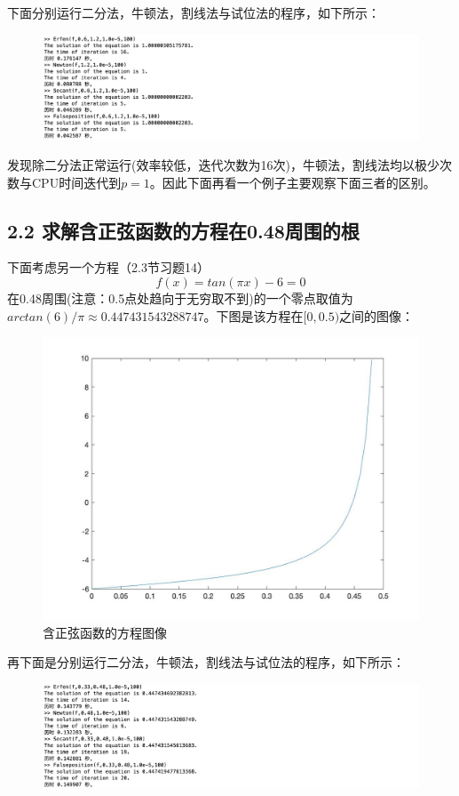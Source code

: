\documentclass{article}
\begin{document}
    下面分别运行二分法，牛顿法，割线法与试位法的程序，如下所示：
    \begin{figure}[h]
    \centering
    \includegraphics[scale=0.5]{运行程序2.jpg}
    \end{figure}

    发现除二分法正常运行(效率较低，迭代次数为16次)，牛顿法，割线法均以极少次数与CPU时间迭代到$p=1$。因此下面再看一个例子主要观察下面三者的区别。

\subsection{2.2 求解含正弦函数的方程在0.48周围的根}

    下面考虑另一个方程（2.3节习题14）
    $$f(x)=tan(\pi x)-6=0
    $$
    在0.48周围(注意：0.5点处趋向于无穷取不到)的一个零点取值为$arctan(6)/\pi\approx0.447431543288747$。下图是该方程在$[0,0.5)$之间的图像：
    \begin{figure}[h]
    \centering
    \includegraphics[scale=0.19]{第二个函数.jpg}
    \caption{含正弦函数的方程图像}
    \label{含正弦函数的方程图像}
    \end{figure}

    再下面是分别运行二分法，牛顿法，割线法与试位法的程序，如下所示：
    \begin{figure}[h]
    \centering
    \includegraphics[scale=0.5]{运行程序3.jpg}
    \end{figure}
\end{document}
